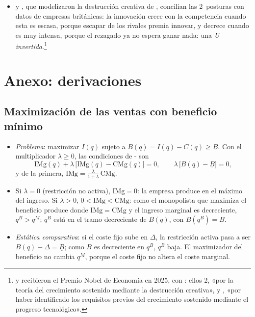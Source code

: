 \documentclass[11pt]{article}
\begin{document}
\begin{itemize}
\begin{itemize}
  \item {} y , que modelizaron la destrucción creativa de , concilian las 2~posturas con datos de empresas británicas: la innovación crece con la competencia cuando esta es escasa, porque escapar de los rivales premia innovar, y decrece cuando es muy intensa, porque el rezagado ya no espera ganar nada: una \emph{U invertida}\nocite{AghionEtAl2005Competition}.\footnote{ y  recibieron el Premio Nobel de Economía en 2025, con : ellos 2, «por la teoría del crecimiento sostenido mediante la destrucción creativa», y , «por haber identificado los requisitos previos del crecimiento sostenido mediante el progreso tecnológico»\nocite{NobelPrize2025}.}
  \end{itemize}
\end{itemize}

\section{Anexo: derivaciones}\label{anexo:derivaciones}

\subsection{Maximización de las ventas con beneficio mínimo}\label{anexo:baumol}

\begin{itemize}
\item \emph{Problema}: maximizar $I(q)$ sujeto a $B(q)=I(q)-C(q)\geq\underline{B}$. Con el multiplicador $\lambda\geq 0$, las condiciones de - son
  \[
  \mathrm{IMg}(q)+\lambda\,\big[\mathrm{IMg}(q)-\mathrm{CMg}(q)\big]=0,\qquad \lambda\,\big[B(q)-\underline{B}\big]=0,
  \]
  y de la primera, $\mathrm{IMg}=\frac{\lambda}{1+\lambda}\,\mathrm{CMg}$.
\item Si $\lambda=0$ (restricción no activa), $\mathrm{IMg}=0$: la empresa produce en el máximo del ingreso. Si $\lambda>0$, $0<\mathrm{IMg}<\mathrm{CMg}$: como el monopolista que maximiza el beneficio produce donde $\mathrm{IMg}=\mathrm{CMg}$ y el ingreso marginal es decreciente, $q^{B}>q^{M}$; $q^{B}$ está en el tramo decreciente de $B(q)$, con $B(q^{B})=\underline{B}$.
\item \emph{Estática comparativa}: si el coste fijo sube en $\Delta$, la restricción activa pasa a ser $B(q)-\Delta=\underline{B}$; como $B$ es decreciente en $q^{B}$, $q^{B}$ baja. El maximizador del beneficio no cambia $q^{M}$, porque el coste fijo no altera el coste marginal.\findemo
\end{itemize}
\end{document}
